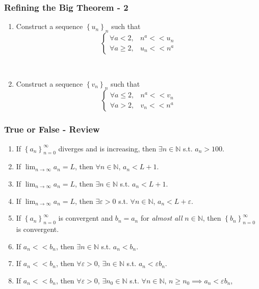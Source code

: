 \documentclass[14pt]{beamer}
\newcommand {\DS} [1] {${\displaystyle #1}$}
\newcommand {\N}{\mathbb{N}}
\newcommand{\e}{\varepsilon}
\newcommand{\setsize}[1]{\fontsize{#1}{#1}\selectfont} %
\newcommand{\smallerfont}{\setsize{13}} %
\newcommand{\an}{\left\{ a_n \right\}_{n=0}^{\infty}}
\newcommand{\bn}{\left\{ b_n \right\}_{n=0}^{\infty}}
\newcommand{\seqs}[1]{\left\{ #1_n \right\}_{n}}
\begin{document}
\begin{frame}[t]
\frametitle{Refining the Big Theorem - 2}

\begin{enumerate}
	\item  Construct a sequence \DS{\seqs{u}} such that
  		$$
			\begin{cases}
				\forall a < 2, & n^a << u_n  \\
				\forall a \geq 2, & u_n << n^a
			\end{cases}
		$$

\

	\item  Construct a sequence \DS{\seqs{v}} such that
  		$$
			\begin{cases}
				\forall a \leq 2, & n^a << v_n  \\
				\forall a > 2, & v_n << n^a
			\end{cases}
		$$
\end{enumerate}   

\end{frame}
\begin{frame}[t]
\smallerfont
\frametitle{True or False - Review}

\begin{enumerate}
	\item  If \DS{\an} diverges and is increasing, then $\exists n \in \N$ s.t. $a_n > 100$.
\vfill
	\item If \DS{\lim_{n \to \infty} a_n = L}, then $\forall n \in \N$, \DS{a_n < L+1}.
\vfill
	\item If \DS{\lim_{n \to \infty} a_n = L}, then $\exists n \in \N$ s.t. \DS{a_n < L+1}.
\vfill
	\item If \DS{\lim_{n \to \infty} a_n = L}, then $\exists \e>0$ s.t.  $\forall n \in \N$, \DS{a_n < L+\e}.
\vfill
	\item If $\an$ is convergent and $b_n =a_n$ for \emph{almost all} $n \in \N$, then $\bn$ is convergent.
\vfill
	\item If $a_n << b_n$, then $\exists n \in \N$ s.t. $a_n <  b_n$. 
\vfill
	\item If $a_n << b_n$, then $\forall \e >0$, $\exists n \in \N$ s.t. $a_n < \e b_n$.
\vfill
	\item If $a_n << b_n$, then $\forall \e >0$, $\exists n_0 \in \N$ s.t. $\forall n \in \N$,  $n \geq n_0 \implies a_n < \e b_n$, 
\vfill
\end{enumerate}

\end{frame}
\end{document}
